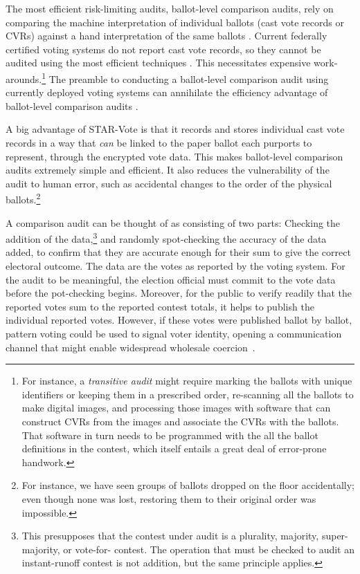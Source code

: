 \documentclass[letterpaper, 10pt, twocolumn]{article}
\newcommand{\projname}{STAR-Vote\xspace}
\begin{document}
The most efficient risk-limiting audits, ballot-level comparison audits, rely on comparing 
the machine interpretation of individual ballots
(cast vote records or CVRs) 
against a hand interpretation of the same ballots \cite{stark10d,benalohEtal11,lindemanStark12}.
Current federally certified voting systems do not report cast vote records, so they cannot
be audited using the most efficient techniques \cite{lindemanStark12,starkWagner12}.
This necessitates expensive work-arounds.\footnote{For instance, a {\em transitive audit\/} might require marking the ballots with unique identifiers
    or keeping them in a prescribed order, re-scanning all the ballots to make digital images,
    and processing those images with software that can construct CVRs from the images and
   associate the CVRs with the ballots.
   That software in turn needs to be programmed with the all the ballot definitions in the contest,
    which itself entails a great deal of error-prone handwork.
}
The preamble to conducting a ballot-level comparison audit using currently deployed voting systems
can annihilate the efficiency advantage of ballot-level comparison
audits \cite{starkWagner12}.

A big advantage of \projname is that it records and stores individual cast vote records in a way that 
{\em can\/} be linked to
the paper ballot each purports to represent, through the encrypted vote data.
This makes ballot-level comparison audits extremely simple and efficient.
It also reduces the vulnerability of the audit to human error, such as accidental changes to the order
of the physical ballots.\footnote{For instance, we have seen groups of ballots dropped on the floor accidentally;
   even though none was lost, restoring them to their original order was impossible.
}

A comparison audit can be thought of as consisting of two parts:
Checking the addition of the data,\footnote{This presupposes that the contest under audit is a plurality, majority, super-majority, or vote-for-
   contest.
   The operation that must be checked to audit an instant-runoff contest is not addition, but the
   same principle applies.
}
and randomly spot-checking the accuracy of the data added, to confirm that they are accurate
enough for their sum to give the correct electoral outcome.
The data are the votes as reported by the voting system.
For the audit to be meaningful, the election official must commit to the vote data before the
pot-checking begins.
Moreover, for the public to verify readily that the reported votes sum to the reported contest totals,
it helps to publish the individual reported votes.
However, if these votes were published ballot by ballot, pattern voting could be used to signal voter identity,
opening a communication channel that might enable 
widespread wholesale coercion~\cite{rescorla09,benalohEtal11}.
\end{document}
